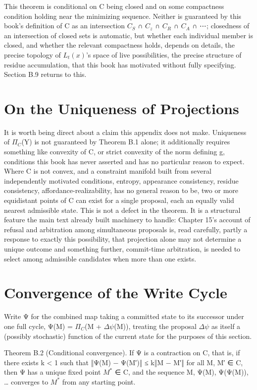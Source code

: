 This theorem is conditional on C being closed and on some compactness condition holding near the minimizing sequence. Neither is guaranteed by this book's definition of C as an intersection \(C_S\) ∩ \(C_z\) ∩ \(C_R\) ∩ \(C_A\) ∩ ⋯; closedness of an intersection of closed sets is automatic, but whether each individual member is closed, and whether the relevant compactness holds, depends on details, the precise topology of \(L_t(x)\)'s space of live possibilities, the precise structure of residue accumulation, that this book has motivated without fully specifying. Section B.9 returns to this.

\section{On the Uniqueness of Projections}

It is worth being direct about a claim this appendix does not make. Uniqueness of \(\Pi_C\)(Y) is not guaranteed by Theorem B.1 alone; it additionally requires something like convexity of C, or strict convexity of the norm defining g, conditions this book has never asserted and has no particular reason to expect. Where C is not convex, and a constraint manifold built from several independently motivated conditions, entropy, appearance consistency, residue consistency, affordance-realizability, has no general reason to be, two or more equidistant points of C can exist for a single proposal, each an equally valid nearest admissible state. This is not a defect in the theorem. It is a structural feature the main text already built machinery to handle: Chapter 15's account of refusal and arbitration among simultaneous proposals is, read carefully, partly a response to exactly this possibility, that projection alone may not determine a unique outcome and something further, commit-time arbitration, is needed to select among admissible candidates when more than one exists.

\section{Convergence of the Write Cycle}

Write Ψ for the combined map taking a committed state to its successor under one full cycle, Ψ(M) = \(\Pi_C\)(M + \(\Delta\psi\)(M)), treating the proposal \(\Delta\psi\) as itself a (possibly stochastic) function of the current state for the purposes of this section.

Theorem B.2 (Conditional convergence). If Ψ is a contraction on C, that is, if there exists k < 1 such that ‖Ψ(M) − Ψ(M′)‖ ≤ k‖M − M′‖ for all M, M′ ∈ C, then Ψ has a unique fixed point \(M^*\) ∈ C, and the sequence M, Ψ(M), Ψ(Ψ(M)), … converges to \(M^*\) from any starting point.

